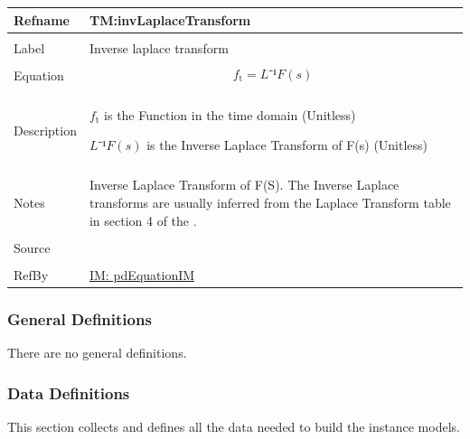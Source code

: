 \documentclass[12pt]{article}
\begin{document}
\noindent
\begin{minipage}{\textwidth}
\begin{tabular}{>{\raggedright}p{}>{\raggedright\arraybackslash}p{}}
\toprule \textbf{Refname} & \textbf{TM:invLaplaceTransform}
\label{TM:invLaplaceTransform}
\\ \midrule \\
Label & Inverse laplace transform
        
\\ \midrule \\
Equation & \begin{displaymath}
           {f_{\text{t}}}=L⁻¹{F(s)}
           \end{displaymath}
\\ \midrule \\
Description & \begin{symbDescription}
              \item{${f_{\text{t}}}$ is the Function in the time domain (Unitless)}
              \item{$L⁻¹{F(s)}$ is the Inverse Laplace Transform of F(s) (Unitless)}
              \end{symbDescription}
\\ \midrule \\
Notes & Inverse Laplace Transform of F(S). The Inverse Laplace transforms are  usually inferred from the Laplace Transform table in   section 4 of the  \cite{laplaceWiki}.
        
\\ \midrule \\
Source & \cite{laplaceWiki}
         
\\ \midrule \\
RefBy & \hyperref[IM:pdEquationIM]{IM: pdEquationIM}
        
\\ \bottomrule
\end{tabular}
\end{minipage}
\subsubsection{General Definitions}
\label{Sec:GDs}
There are no general definitions.

\subsubsection{Data Definitions}
\label{Sec:DDs}
This section collects and defines all the data needed to build the instance models.
\end{document}
